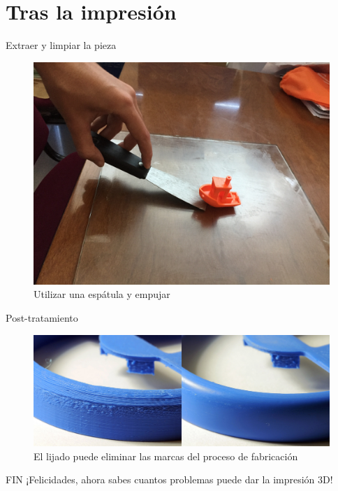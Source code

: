 \documentclass{beamer}
\begin{document}
	\section{Tras la impresión}
	\begin{frame}{Extraer y limpiar la pieza}
		\begin{figure}
			\includegraphics[width=.75\textwidth]{images/extraer}
			\caption{Utilizar una espátula y empujar}
		\end{figure}
	\end{frame}
	\begin{frame}{Post-tratamiento}
		\begin{figure}
			\includegraphics[width=\textwidth]{images/lijado}
			\caption{El lijado puede eliminar las marcas del proceso de fabricación}
		\end{figure}
	\end{frame}
	
	\begin{frame}[standout]{FIN}
		¡Felicidades, ahora sabes cuantos problemas puede dar la impresión 3D!
	\end{frame}
\end{document}
